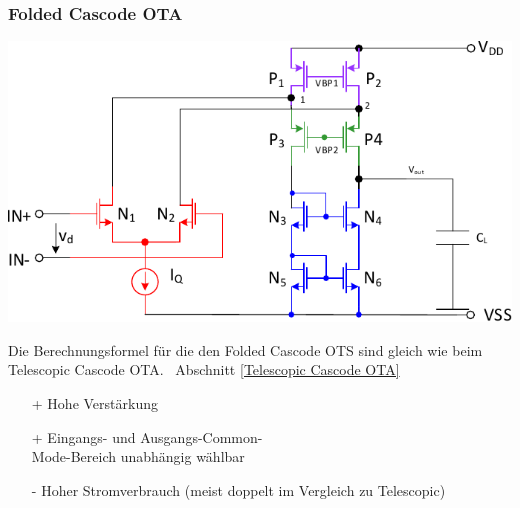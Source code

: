 \subsubsection{Folded Cascode OTA}

\begin{minipage}[t]{0.5\columnwidth}
    \includegraphics[width=\columnwidth, align=t]{images/11_OTA_einstufig_gefaltete_kaskode.pdf}
\end{minipage}
\hfill
\begin{minipage}[t]{0.48\columnwidth}
    Die Berechnungsformel für die den Folded Cascode OTS sind gleich wie beim Telescopic Cascode OTA. 
    \textrightarrow\ Abschnitt \ref{Telescopic Cascode OTA}

    \smallskip

    \begin{itemize}
        \item[+] Hohe Verstärkung
        \item[+] Eingangs- und Ausgangs-Common- \\
            Mode-Bereich unabhängig wählbar
        \item[-] Hoher Stromverbrauch (meist doppelt im Vergleich zu Telescopic)
    \end{itemize}
\end{minipage}



